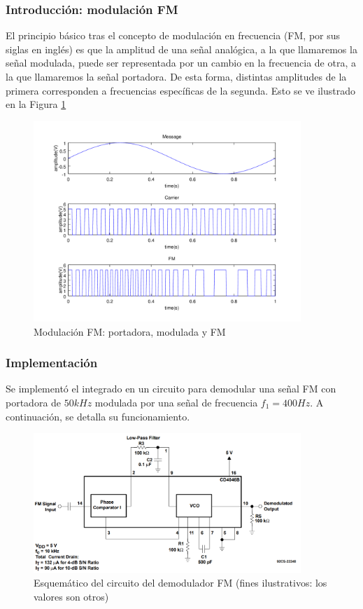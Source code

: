 \subsubsection{Introducción: modulación FM}
El principio básico tras el concepto de modulación en frecuencia (FM, por sus siglas en inglés) es que la amplitud de una señal analógica, a la que llamaremos la señal modulada, puede ser representada por un cambio en la frecuencia de otra, a la que llamaremos la señal portadora. De esta forma, distintas amplitudes de la primera corresponden a frecuencias específicas de la segunda. Esto se ve ilustrado en la Figura \ref{modulacionfmsenales}
\begin{figure}[H]
    \centering
    \includegraphics[width=0.9\textwidth]{../Ex2/resources/modulacionfmsenales.png}
    \caption{Modulación FM: portadora, modulada y FM}
    \label{modulacionfmsenales}
\end{figure}

\subsubsection{Implementación}
Se implementó el integrado en un circuito para demodular una señal FM con portadora de $50kHz$ modulada por una señal de frecuencia $f_{1}=400Hz$. A continuación, se detalla su funcionamiento.
\begin{figure}[H]
    \centering
    \includegraphics[width=0.9\textwidth]{../Ex2/resources/demoduladorfmconexion.png}
    \caption{Esquemático del circuito del demodulador FM (fines ilustrativos: los valores son otros)}
    \label{demoduladorfmconexion}
\end{figure}

